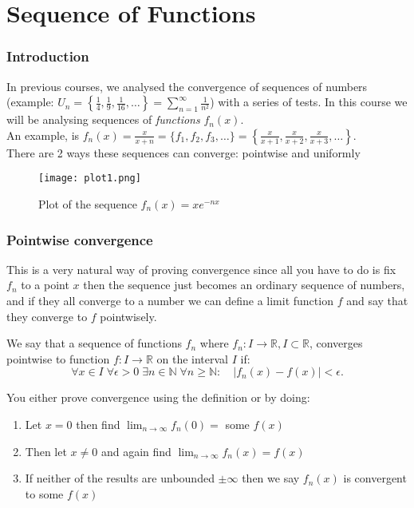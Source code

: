 \part{Sequence of Functions}


\section{Introduction}

In previous courses, we analysed the convergence of sequences of numbers (example: $U_n = \left\{ \frac{1}{4},\frac{1}{9},\frac{1}{16},\ldots \right\} =\sum_{n=1}^{\infty} \frac{1}{n^2} $) with a series of tests. In this course we will be analysing sequences of \emph{functions} $f_n(x)$.\\
An example, is $f_n(x)=\frac{x}{x+n} =\{f_1,f_2,f_3,\ldots\}  =\left\{ \frac{x}{x+1},\frac{x}{x+2},\frac{x}{x+3},\ldots \right\}$.\\

There are 2 ways these sequences can converge: pointwise and uniformly

\begin{figure}[H]
    \centering
    \texttt{[image: plot1.png]}
    \caption*{Plot of the sequence $f_n(x)=xe^{-nx}$}
    \label{fig:plot}
\end{figure}

\section{Pointwise convergence}

This is a very natural way of proving convergence since all you have to do is fix $f_n$ to a point $x$ then the sequence just becomes an ordinary sequence of numbers, and if they all converge to a number we can define a limit function $f$ and say that they converge to $f$ pointwisely.

\begin{definition}
    We say that a sequence of functions $f_n$ where $f_n:I \to \mathbb{R},I\subset \mathbb{R}$, converges pointwise to function $f:I\to \mathbb{R}$ on the interval $I$ if:
    \[
    \forall x\in I \; \forall \epsilon >0 \; \exists n\in \mathbb{N} \; \forall n\ge \mathbb{N}: \quad \left| f_n(x)-f(x) \right|<\epsilon 
    .\] 
\end{definition}
You either prove convergence using the definition or by doing:
\begin{enumerate}
    \item Let $x=0$ then find $\lim_{n \to \infty} f_n(0)=$ some $f(x)$
    \item Then let $x\neq 0$ and again find $\lim_{n \to \infty} f_n(x)=f(x)$ 
    \item If neither of the results are unbounded $\pm \infty$ then we say $f_n(x)$ is convergent to some $f(x)$
\end{enumerate}

